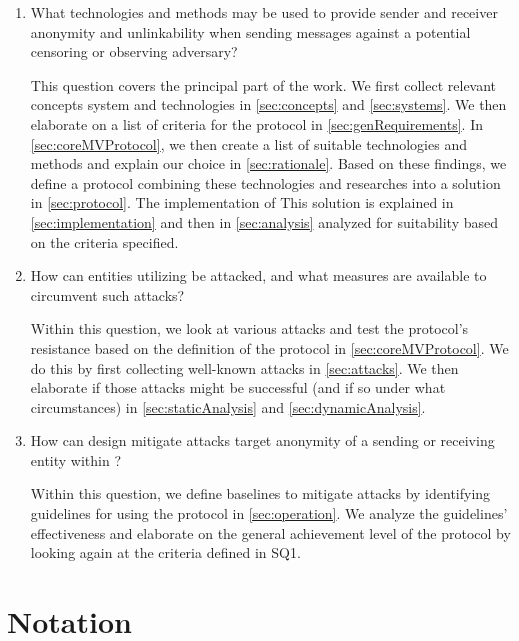 \begin{enumerate}
	\item What technologies and methods may be used to provide sender and receiver anonymity and unlinkability when sending messages against a potential censoring or observing adversary? 
	
	This question covers the principal part of the work. We first collect relevant concepts system and technologies in \cref{sec:concepts} and \ref{sec:systems}. We then elaborate on a list of criteria for the \MessageVortex{} protocol in \cref{sec:genRequirements}. In \cref{sec:coreMVProtocol}, we then create a list of suitable technologies and methods and explain our choice in \cref{sec:rationale}. Based on these findings, we define a protocol combining these technologies and researches into a solution in \cref{sec:protocol}. The implementation of This solution is explained in \cref{sec:implementation} and then in \cref{sec:analysis} analyzed for suitability based on the criteria specified. 
	
	\item How can entities utilizing \MessageVortex{} be attacked, and what measures are available to circumvent such attacks? 
	
	Within this question, we look at various attacks and test the protocol's resistance based on the definition of the protocol in \cref{sec:coreMVProtocol}. We do this by first collecting well-known attacks in \cref{sec:attacks}. We then elaborate if those attacks might be successful (and if so under what circumstances) in \cref{sec:staticAnalysis} and \cref{sec:dynamicAnalysis}.
	
	\item How can design mitigate attacks target anonymity of a sending or receiving entity within \MessageVortex? 
	
	Within this question, we define baselines to mitigate attacks by identifying guidelines for using the protocol in \cref{sec:operation}. We analyze the guidelines' effectiveness and elaborate on the general achievement level of the protocol by looking again at the criteria defined in SQ1. 
	
\end{enumerate}

\chapter{Notation}

